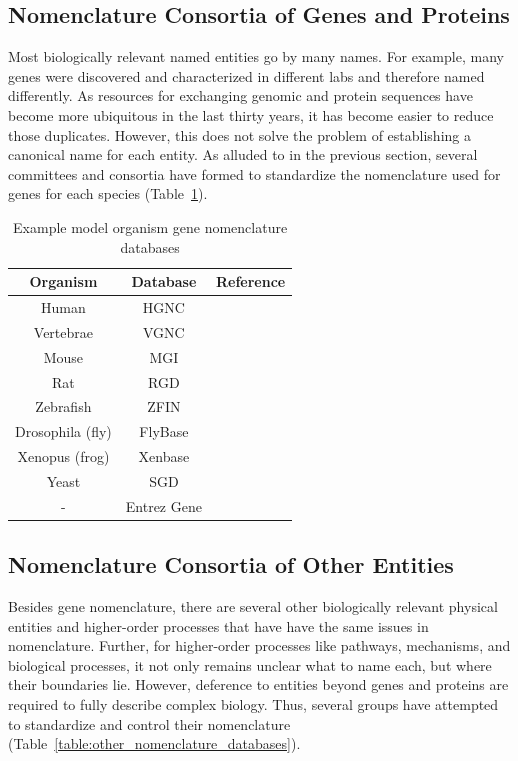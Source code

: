 \subsection{Nomenclature Consortia of Genes and Proteins}

Most biologically relevant named entities go by many names.
For example, many genes were discovered and characterized in different labs and therefore named differently.
As resources for exchanging genomic and protein sequences have become more ubiquitous in the last thirty years, it has become easier to reduce those duplicates.
However, this does not solve the problem of establishing a canonical name for each entity.
As alluded to in the previous section, several committees and consortia have formed to standardize the nomenclature used for genes for each species (Table~\ref{table:gene_nomenclature_databases}).

\begin{table}
    \centering
    \begin{tabular}{ c c c }
        Organism & Database & Reference \\
        \hline
        Human & HGNC &\cite{Yates2017} \\
        Vertebrae & VGNC &\cite{Yates2017} \\
        Mouse & MGI &\cite{Blake2017} \\
        Rat & RGD &\cite{Shimoyama2015} \\
        Zebrafish & ZFIN &\cite{Howe2013}  \\
        Drosophila (fly) & FlyBase &\cite{Thurmond2019}\\
        Xenopus (frog) & Xenbase &\cite{Karimi2018}  \\
        Yeast & SGD &\cite{Cherry2012} \\
        - & Entrez Gene &\cite{Maglott2011}  \\
    \end{tabular}
    \caption{Example model organism gene nomenclature databases}
    \label{table:gene_nomenclature_databases}
\end{table}

\subsection{Nomenclature Consortia of Other Entities}

Besides gene nomenclature, there are several other biologically relevant physical entities and higher-order processes that have have the same issues in nomenclature.
Further, for higher-order processes like pathways, mechanisms, and biological processes, it not only remains unclear what to name each, but where their boundaries lie.
However, deference to entities beyond genes and proteins are required to fully describe complex biology.
Thus, several groups have attempted to standardize and control their nomenclature (Table~\ref{table:other_nomenclature_databases}).

